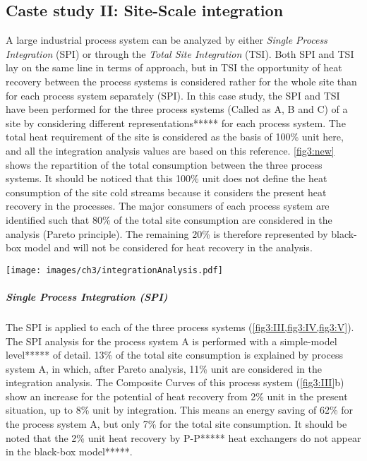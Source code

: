 \subsection{Caste study II: Site-Scale integration}

A large industrial process system can be analyzed by either \textit{Single Process Integration} (SPI) or through the \textit{Total Site Integration} (TSI). Both SPI and TSI lay on the same line in terms of approach, but in TSI the opportunity of heat recovery between the process systems is considered rather for the whole site than for each process system separately (SPI). In this case study, the SPI and TSI have been performed for the three process systems (Called as A, B and C) of a site by considering different representations***** for each process system. The total heat requirement of the site is considered as the basis of 100\% unit here, and all the integration analysis values are based on this reference. \cref{fig3:new} shows the repartition of the total consumption between the three process systems. It should be noticed that this 100\% unit does not define the heat consumption of the site cold streams because it considers the present heat recovery in the processes. The major consumers of each process system are identified such that 80\% of the total site consumption are considered in the analysis (Pareto principle). The remaining 20\% is therefore represented by black-box model and will not be considered for heat recovery in the analysis. 

\begin{figure*}[!ht]
\vspace{5mm}
\begin{center}
\texttt{[image: images/ch3/integrationAnalysis.pdf]}
\caption{Summary of SPI and TSI for the three process subsystems of the site}
\label{fig3:new}
\end{center}
\end{figure*}

\subparagraph{Single Process Integration (SPI)}

The SPI is applied to each of the three process systems (\cref{fig3:III,fig3:IV,fig3:V}). The SPI analysis for the process system A is performed with a simple-model level***** of detail. 13\% of the total site consumption is explained by process system A, in which, after Pareto analysis, 11\% unit are considered in the integration analysis. The Composite Curves of this process system (\cref{fig3:III}b) show an increase for the potential of heat recovery from 2\% unit in the present situation, up to 8\% unit by integration. This means an energy saving of 62\% for the process system A, but only 7\% for the total site consumption. It should be noted that the 2\% unit heat recovery by P-P***** heat exchangers do not appear in the black-box model*****.

